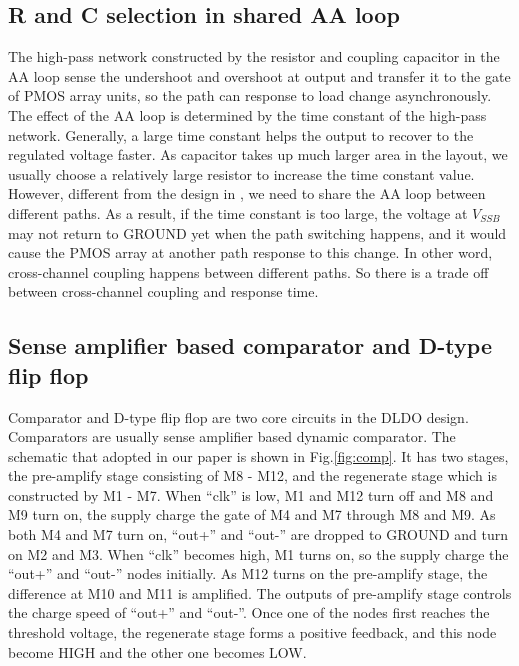 \documentclass[journal]{IEEEtran}
\begin{document}
\subsection{R and C selection in shared AA loop}
The high-pass network constructed by the resistor and coupling capacitor in the AA loop sense the undershoot and overshoot at output and transfer it to the gate of PMOS array units, so the path can response to load change asynchronously. The effect of the AA loop is determined by the time constant of the high-pass network. Generally, a large time constant helps the output to recover to the regulated voltage faster. As capacitor takes up much larger area in the layout, we usually choose a relatively large resistor to increase the time constant value. However, different from the design in \cite{NANDbasedAAloop,AALDO1}, we need to share the AA loop between different paths. As a result, if the time constant is too large, the voltage at $V_{SSB}$ may not return to GROUND yet when the path switching happens, and it would cause the PMOS array at another path response to this change. In other word, cross-channel coupling happens between different paths. So there is a trade off between cross-channel coupling and response time.
\subsection{Sense amplifier based comparator and D-type flip flop}
Comparator and D-type flip flop are two core circuits in the DLDO design. Comparators are usually sense amplifier based dynamic comparator. The schematic that adopted in our paper is shown in Fig.\ref{fig:comp}\cite{comparator}. It has two stages, the pre-amplify stage consisting of M8 - M12, and the regenerate stage which is constructed by M1 - M7. When ``clk'' is low, M1 and M12 turn off and M8 and M9 turn on, the supply charge the gate of M4 and M7 through M8 and M9. As both M4 and M7 turn on, ``out+'' and ``out-'' are dropped to GROUND and turn on M2 and M3. When ``clk'' becomes high, M1 turns on, so the supply charge the ``out+'' and ``out-'' nodes initially. As M12 turns on the pre-amplify stage, the difference at M10 and M11 is amplified. The outputs of pre-amplify stage controls the charge speed of ``out+'' and ``out-''. Once one of the nodes first reaches the threshold voltage, the regenerate stage forms a positive feedback, and this node become HIGH and the other one becomes LOW.
\end{document}
